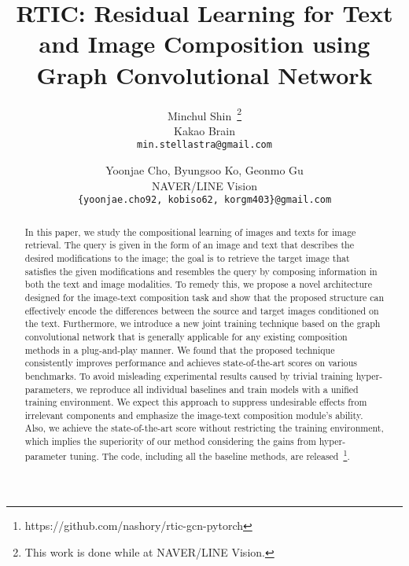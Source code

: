 \documentclass[10pt,twocolumn,letterpaper]{article}
\begin{document}
\title{RTIC: Residual Learning for Text and Image Composition using Graph Convolutional Network}

\author{Minchul Shin~\thanks{This work is done while at NAVER/LINE Vision.} \\
Kakao Brain \\
{\tt\small min.stellastra@gmail.com}
\and
Yoonjae Cho, \space\space Byungsoo Ko, \space\space Geonmo Gu \\
NAVER/LINE Vision\\
{\tt\small \{yoonjae.cho92, kobiso62, korgm403\}@gmail.com}
}


\maketitle

\begin{abstract}
In this paper, we study the compositional learning of images and texts for image retrieval. The query is given in the form of an image and text that describes the desired modifications to the image; the goal is to retrieve the target image that satisfies the given modifications and resembles the query by composing information in both the text and image modalities. To remedy this, we propose a novel architecture designed for the image-text composition task and show that the proposed structure can effectively encode the differences between the source and target images conditioned on the text. Furthermore, we introduce a new joint training technique based on the graph convolutional network that is generally applicable for any existing composition methods in a plug-and-play manner. We found that the proposed technique consistently improves performance and achieves state-of-the-art scores on various benchmarks. To avoid misleading experimental results caused by trivial training hyper-parameters, we reproduce all individual baselines and train models with a unified training environment. We expect this approach to suppress undesirable effects from irrelevant components and emphasize the image-text composition module's ability. Also, we achieve the state-of-the-art score without restricting the training environment, which implies the superiority of our method considering the gains from hyper-parameter tuning. The code, including all the baseline methods, are released~\footnote{https://github.com/nashory/rtic-gcn-pytorch}.
\end{abstract}
\end{document}
